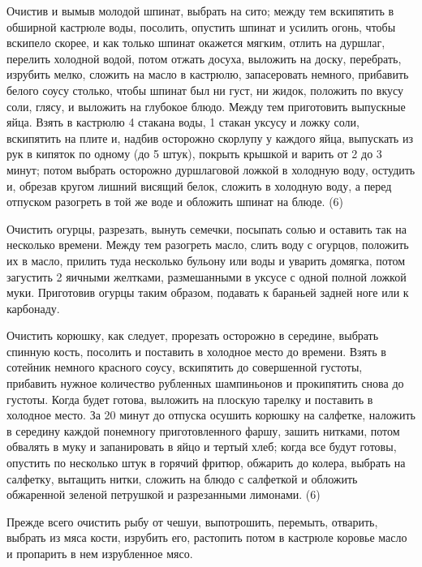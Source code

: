 Очистив и вымыв молодой шпинат, выбрать на сито; между тем вскипятить в обширной кастрюле воды, посолить, опустить шпинат и усилить огонь, чтобы вскипело скорее, и как только шпинат окажется мягким, отлить на дуршлаг, перелить холодной водой, потом отжать досуха, выложить на доску, перебрать, изрубить мелко, сложить на масло в кастрюлю, запасеровать немного, прибавить белого соусу столько, чтобы шпинат был ни густ, ни жидок, положить по вкусу соли, глясу, и выложить на глубокое блюдо. Между тем приготовить выпускные яйца. Взять в кастрюлю 4 стакана воды, 1 стакан уксусу и ложку соли, вскипятить на плите и, надбив осторожно скорлупу у каждого яйца, выпускать из рук в кипяток по одному (до 5 штук), покрыть крышкой и варить от 2 до 3 минут; потом выбрать осторожно дуршлаговой ложкой в холодную воду, остудить и, обрезав кругом лишний висящий белок, сложить в холодную воду, а перед отпуском разогреть в той же воде и обложить шпинат на блюде. (6) 


Очистить огурцы, разрезать, вынуть семечки, посыпать солью и оставить так на несколько времени. Между тем разогреть масло, слить воду с огурцов, положить их в масло, прилить туда несколько бульону или воды и уварить домягка, потом загустить 2 яичными желтками, размешанными в уксусе с одной полной ложкой муки. Приготовив огурцы таким образом, подавать к бараньей задней ноге или к карбонаду. 


Очистить корюшку, как следует, прорезать осторожно в середине, выбрать спинную кость, посолить и поставить в холодное место до времени. Взять в сотейник немного красного соусу, вскипятить до совершенной густоты, прибавить нужное количество рубленных шампиньонов и прокипятить снова до густоты. Когда будет готова, выложить на плоскую тарелку и поставить в холодное место. За 20 минут до отпуска осушить корюшку на салфетке, наложить в середину каждой понемногу приготовленного фаршу, зашить нитками, потом обвалять в муку и запанировать в яйцо и тертый хлеб; когда все будут готовы, опустить по несколько штук в горячий фритюр, обжарить до колера, выбрать на салфетку, вытащить нитки, сложить на блюдо с салфеткой и обложить обжаренной зеленой петрушкой и разрезанными лимонами. (6) 


Прежде всего очистить рыбу от чешуи, выпотрошить, перемыть, отварить, выбрать из мяса кости, изрубить его, растопить потом в кастрюле коровье масло и пропарить в нем изрубленное мясо. 

